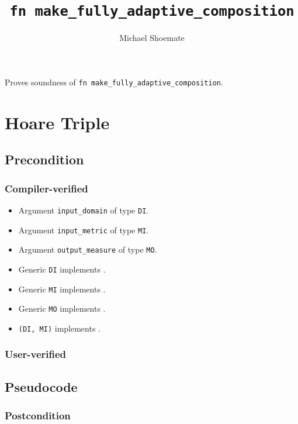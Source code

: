 \documentclass{article}
\title{\texttt{fn make\_fully\_adaptive\_composition}}
\author{Michael Shoemate}
\date{}
\begin{document}
\maketitle

\contrib
Proves soundness of \texttt{fn make\_fully\_adaptive\_composition}.

\section{Hoare Triple}
\subsection*{Precondition}
\subsubsection*{Compiler-verified}
\begin{itemize}
    \item Argument \texttt{input\_domain} of type \texttt{DI}.
    \item Argument \texttt{input\_metric} of type \texttt{MI}.
    \item Argument \texttt{output\_measure} of type \texttt{MO}.
    \item Generic \texttt{DI} implements .
    \item Generic \texttt{MI} implements .
    \item Generic \texttt{MO} implements .
    \item \texttt{(DI, MI)} implements .
\end{itemize}
\subsubsection*{User-verified}


\subsection*{Pseudocode}


\subsubsection*{Postcondition}
\end{document}
